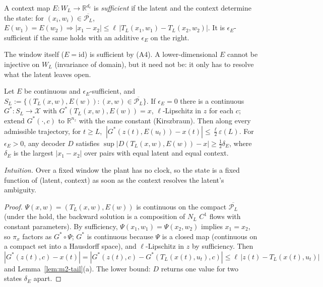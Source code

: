 \begin{definition}\label{def:m1-suff}
A context map $E:W_L\to\mathbb R^{d_c}$ is \emph{sufficient} if the latent and the context determine the state:
for $(x_i,w_i)\in\overline{\mathcal P_L}$, $E(w_1)=E(w_2)\Rightarrow|x_1-x_2|\le\ell\,|T_L(x_1,w_1)-T_L(x_2,w_2)|$.
It is $\epsilon_E$-sufficient if the same holds with an additive $\epsilon_E$ on the right.
\end{definition}
\noindent The window itself ($E=\mathrm{id}$) is sufficient by (A4). A lower-dimensional $E$ cannot be
injective on $W_L$ (invariance of domain), but it need not be: it only has to resolve what the latent leaves open.

\begin{lemma}\label{lem:m1-window}
Let $E$ be continuous and $\epsilon_E$-sufficient, and $S_L:=\{(T_L(x,w),E(w)):(x,w)\in\overline{\mathcal P_L}\}$.
If $\epsilon_E=0$ there is a continuous $G^*:S_L\to\mathcal X$ with $G^*(T_L(x,w),E(w))=x$, $\ell$-Lipschitz in $z$
for each $c$; extend $G^*(\cdot,c)$ to $\mathbb R^{n_z}$ with the same constant (Kirszbraun). Then along every
admissible trajectory, for $t\ge L$,
$\ |G^*(z(t),E(u_t))-x(t)|\le\tfrac{\ell}{2}\varepsilon(L).$
For $\epsilon_E>0$, any decoder $D$ satisfies $\sup|D(T_L(x,w),E(w))-x|\ge\tfrac12\delta_E$, where $\delta_E$ is the
largest $|x_1-x_2|$ over pairs with equal latent and equal context.
\end{lemma}
\noindent\emph{Intuition.} Over a fixed window the plant has no clock, so the state is a fixed function of
(latent, context) as soon as the context resolves the latent's ambiguity.
\begin{proof}
$\Psi(x,w)=(T_L(x,w),E(w))$ is continuous on the compact $\overline{\mathcal P_L}$ (under the hold, the backward
solution is a composition of $N_L$ $C^1$ flows with constant parameters). By sufficiency, $\Psi(x_1,w_1)=\Psi(x_2,w_2)$
implies $x_1=x_2$, so $\pi_x$ factors as $G^*\circ\Psi$; $G^*$ is continuous because $\Psi$ is a closed map
(continuous on a compact set into a Hausdorff space), and $\ell$-Lipschitz in $z$ by sufficiency. Then
$|G^*(z(t),c)-x(t)|=|G^*(z(t),c)-G^*(T_L(x(t),u_t),c)|\le\ell\,|z(t)-T_L(x(t),u_t)|$ and Lemma~\ref{lem:m2-tail}(a).
The lower bound: $D$ returns one value for two states $\delta_E$ apart.
\end{proof}

